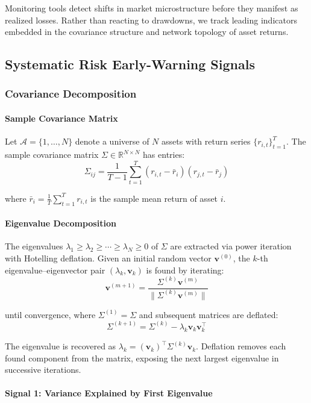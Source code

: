 Monitoring tools detect shifts in market microstructure before they manifest as realized losses. Rather than reacting to drawdowns, we track leading indicators embedded in the covariance structure and network topology of asset returns.

\subsection{Systematic Risk Early-Warning Signals}

\subsubsection{Covariance Decomposition}

\paragraph{Sample Covariance Matrix}

Let $\mathcal{A} = \{1, \ldots, N\}$ denote a universe of $N$ assets with return series $\{r_{i,t}\}_{t=1}^{T}$. The sample covariance matrix $\Sigma \in \mathbb{R}^{N \times N}$ has entries:
\[
\Sigma_{ij} = \frac{1}{T-1} \sum_{t=1}^{T} (r_{i,t} - \bar{r}_i)(r_{j,t} - \bar{r}_j)
\]

where $\bar{r}_i = \frac{1}{T}\sum_{t=1}^{T} r_{i,t}$ is the sample mean return of asset $i$.

\paragraph{Eigenvalue Decomposition}

The eigenvalues $\lambda_1 \geq \lambda_2 \geq \cdots \geq \lambda_N \geq 0$ of $\Sigma$ are extracted via power iteration with Hotelling deflation. Given an initial random vector $\mathbf{v}^{(0)}$, the $k$-th eigenvalue--eigenvector pair $(\lambda_k, \mathbf{v}_k)$ is found by iterating:
\[
\mathbf{v}^{(m+1)} = \frac{\Sigma^{(k)} \mathbf{v}^{(m)}}{\|\Sigma^{(k)} \mathbf{v}^{(m)}\|}
\]

until convergence, where $\Sigma^{(1)} = \Sigma$ and subsequent matrices are deflated:
\[
\Sigma^{(k+1)} = \Sigma^{(k)} - \lambda_k \mathbf{v}_k \mathbf{v}_k^\top
\]

The eigenvalue is recovered as $\lambda_k = (\mathbf{v}_k)^\top \Sigma^{(k)} \mathbf{v}_k$. Deflation removes each found component from the matrix, exposing the next largest eigenvalue in successive iterations.

\paragraph{Signal 1: Variance Explained by First Eigenvalue}

